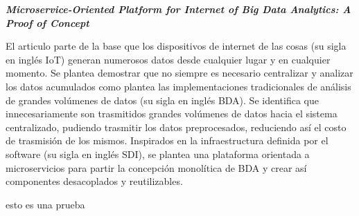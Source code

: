 
\textbf{\emph{Microservice-Oriented Platform for Internet of Big
Data Analytics: A Proof of Concept}} \cite{li_microservice-oriented_2019} 
 
El articulo parte de la base que los dispositivos de internet de las cosas (su sigla en inglés IoT) generan numerosos datos desde cualquier lugar y en cualquier momento. Se plantea demostrar que no siempre es necesario centralizar y analizar los datos acumulados como plantea las implementaciones tradicionales de análisis de grandes volúmenes de datos (su sigla en inglés BDA).
Se identifica que innecesariamente son trasmitidos grandes volúmenes de datos hacia el sistema centralizado, pudiendo trasmitir los datos preprocesados, reduciendo así el costo de trasmisión de los mismos. Inspirados en la infraestructura definida por el software (su sigla en inglés SDI), se plantea una plataforma orientada a microservicios para partir la concepción monolítica de BDA y crear así componentes desacoplados y reutilizables.


esto es una prueba 